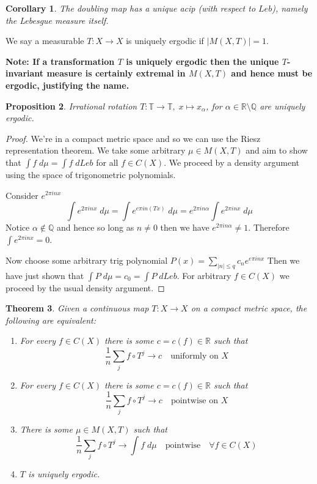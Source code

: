 \documentclass[11pt]{article}
\newcommand{\abs}[1]{\left|#1\right|}
\newcommand{\R}{\mathbb{R}}
\newcommand{\Q}{\mathbb{Q}}
\newcommand{\dm}{\;d\mu}
\newenvironment{defin}
	{\begin{mdframed}[backgroundcolor=white, roundcorner=5pt, linewidth=1pt]}
	{\end{mdframed}}
\newcommand{\mdf}[1]{{\color{red} #1}}
\newenvironment{note}
	{\begin{mdframed}[backgroundcolor=white, linecolor=red, roundcorner=5pt, linewidth=1pt]\bfseries{Note:}\normalfont}
	{\end{mdframed}}
\newtheorem{prop}{Proposition}[section]
\newtheorem{theorem}[prop]{Theorem}
\newtheorem{cor}[prop]{Corollary}
\begin{document}
\begin{cor}
	The doubling map has a unique acip (with respect to $Leb$), namely the Lebesgue measure itself.
\end{cor}

\begin{defin}
	We say a measurable $T:X\to X$ is \mdf{uniquely ergodic} if $\abs{M(X, T)}=1$.
\end{defin}

\begin{note}
	If a transformation $T$ is uniquely ergodic then the unique $T$-invariant measure is certainly extremal in $M(X, T)$ and hence must be ergodic, justifying the name.
\end{note}

\begin{prop}
Irrational rotation $T:\mathbb{T}\to \mathbb{T}, \; x\mapsto x_\alpha$, for $\alpha\in\R\setminus\Q$ are uniquely ergodic.
\end{prop}

\begin{proof}
We're in a compact metric space and so we can use the Riesz representation theorem.
We take some arbitrary $\mu\in M(X, T)$ and aim to show that $\int f\;d\mu = \int f \;dLeb$ for all $f\in C(X)$.
We proceed by a density argument using the space of trigonometric polynomials.

Consider $e^{2\pi i n x}$
\[
	\int e^{2\pi i n x} \; d\mu = \int e^{e\pi i n (Tx)} \; d\mu = e^{2\pi i n \alpha}\int e^{2\pi i n x} \; d\mu
\]
Notice $\alpha\not\in \Q$ and hence so long as $n\neq 0$ then we have $e^{2\pi i n \alpha}\neq 1$.
Therefore $\int e^{2\pi i n x} = 0$.

Now choose some arbitrary trig polynomial $P(x) = \sum_{\abs{n}\leq q}c_n e^{e\pi i n x}$
Then we have just shown that $\int P \dm = c_0 = \int P \; dLeb$.
For arbitrary $f\in C(X)$ we proceed by the usual density argument.
\end{proof}

\begin{theorem}
Given a continuous map $T:X\to X$ on a compact metric space, the following are equivalent:
\begin{enumerate}[label=(\alph*)]
	\item For every $f\in C(X)$ there is some $c=c(f)\in \R$ such that
		\[
			\frac{1}{n}\sum_{j}f\circ T^j \to c\quad\text{uniformly on }X
		\]
	\item For every $f\in C(X)$ there is some $c=c(f)\in \R$ such that
		\[
			\frac{1}{n}\sum_{j}f\circ T^j \to c\quad\text{pointwise on }X
		\]
	\item There is some $\mu\in M(X, T)$ such that
		\[
			\frac{1}{n}\sum_{j}f\circ T^j \to \int f\dm \quad\text{pointwise}\quad\forall f\in C(X)
		\]
	\item $T$ is uniquely ergodic.
\end{enumerate}
\end{theorem}
\end{document}
